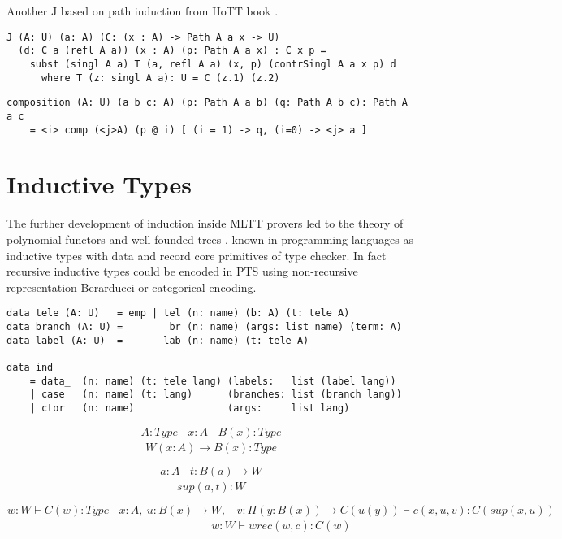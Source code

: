 \documentclass{aip-cp}
\begin{document}
Another J based on path induction from HoTT book \cite{HoTT13}.

\begin{lstlisting}[mathescape=true]
J (A: U) (a: A) (C: (x : A) -> Path A a x -> U)
  (d: C a (refl A a)) (x : A) (p: Path A a x) : C x p =
    subst (singl A a) T (a, refl A a) (x, p) (contrSingl A a x p) d
      where T (z: singl A a): U = C (z.1) (z.2)
\end{lstlisting}

\begin{lstlisting}[mathescape=true]
composition (A: U) (a b c: A) (p: Path A a b) (q: Path A b c): Path A a c
    = <i> comp (<j>A) (p @ i) [ (i = 1) -> q, (i=0) -> <j> a ]
\end{lstlisting}

\section{Inductive Types}

The further development of induction \cite{Dybjer94,Vene00} inside MLTT provers led
to the theory of polynomial functors and well-founded trees \cite{Gambino03},
known in programming languages as inductive types with data
and record core primitives of type checker. In fact recursive inductive
types \cite{Wadler90} could be encoded in PTS using non-recursive representation
Berarducci \cite {Bohm85} or categorical encoding.

\begin{lstlisting}[mathescape=true]
data tele (A: U)   = emp | tel (n: name) (b: A) (t: tele A)
data branch (A: U) =        br (n: name) (args: list name) (term: A)
data label (A: U)  =       lab (n: name) (t: tele A)

data ind
    = data_  (n: name) (t: tele lang) (labels:   list (label lang))
    | case   (n: name) (t: lang)      (branches: list (branch lang))
    | ctor   (n: name)                (args:     list lang)
\end{lstlisting}

\begin{equation}
\tag{$W$-formation}
\dfrac
{A:Type\ \ \ \ x:A\ \ \ \ B(x):Type}
{W (x:A) \rightarrow B(x) : Type}
\end{equation}

\begin{equation}
\tag{$W$-intro}
\dfrac
{a:A\ \ \ \ t: B(a) \rightarrow W}
{sup(a,t) : W}
\end{equation}

\begin{equation}
\tag{$W$-elimination}
\dfrac
{w: W \vdash C(w) : Type\ \ \ \ x:A,\ u:B(x) \rightarrow W,\ \ \ \ v:\Pi (y:B(x)) \rightarrow C(u(y)) \vdash c(x,u,v):C(sup(x,u))}
{w:W \vdash wrec(w,c):C(w)}
\end{equation}
\end{document}
